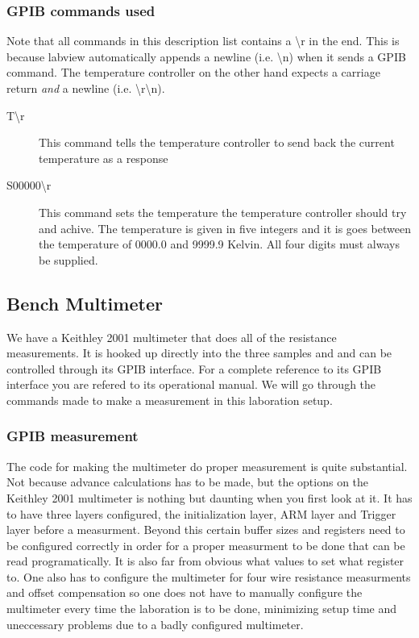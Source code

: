 \documentclass[a4paper,12pt]{article}
\begin{document}
\subsubsection{GPIB commands used}
Note that all commands in this description list contains a {\textbackslash}r in the end. This is because labview automatically appends a newline (i.e. {\textbackslash}n) when it sends a GPIB command. The temperature controller on the other hand expects a carriage return \emph{and} a newline (i.e. {\textbackslash}r{\textbackslash}n).
\begin{description}
\item [T{\textbackslash}r] This command tells the temperature controller to send back the current temperature as a response 
\item [S00000{\textbackslash}r] This command sets the temperature the temperature controller should try and achive. The temperature is given in five integers and it is goes between the temperature of 0000.0 and 9999.9 Kelvin. All four digits must always be supplied. 
\end{description}

\subsection{Bench Multimeter}
We have a Keithley 2001 multimeter that does all of the resistance measurements. It is hooked up directly into the three samples and and can be controlled through its GPIB interface. For a complete reference to its GPIB interface you are refered to its operational manual. We will go through the commands made to make a measurement in this laboration setup.

\subsubsection{GPIB measurement}
The code for making the multimeter do proper measurement is quite substantial. Not because advance calculations has to be made, but the options on the Keithley 2001 multimeter is nothing but daunting when you first look at it. It has to have three layers configured, the initialization layer, ARM layer and Trigger layer before a measurment. Beyond this certain buffer sizes and registers need to be configured correctly in order for a proper measurment to be done that can be read programatically. It is also far from obvious what values to set what register to. One also has to configure the multimeter for four wire resistance measurments and offset compensation so one does not have to manually configure the multimeter every time the laboration is to be done, minimizing setup time and uneccessary problems due to a badly configured multimeter. 
\end{document}
